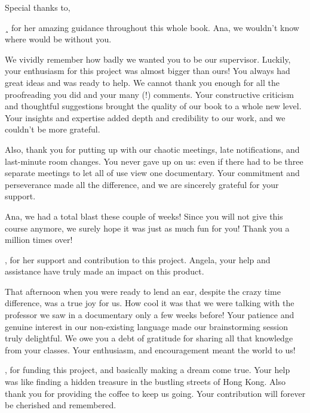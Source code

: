 
Special thanks to, 

¸ for her amazing guidance throughout this whole book. Ana, we wouldn’t know where would be without you. 

We vividly remember how badly we wanted you to be our supervisor. Luckily, your enthusiasm for this project was almost bigger than ours! You always had great ideas and was ready to help. We cannot thank you enough for all the proofreading you did and your many (!) comments. Your constructive criticism and thoughtful suggestions brought the quality of our book to a whole new level. Your insights and expertise added depth and credibility to our work, and we couldn’t be more grateful.  

Also, thank you for putting up with our chaotic meetings, late notifications, and last-minute room changes. You never gave up on us: even if there had to be three separate meetings to let all of use view one documentary. Your commitment and perseverance made all the difference, and we are sincerely grateful for your support. 

Ana, we had a total blast these couple of weeks! Since you will not give this course anymore, we surely hope it was just as much fun for you! Thank you a million times over! 

  

, for her support and contribution to this project. Angela, your help and assistance have truly made an impact on this product.  

That afternoon when you were ready to lend an ear, despite the crazy time difference, was a true joy for us. How cool it was that we were talking with the professor we saw in a documentary only a few weeks before! Your patience and genuine interest in our non-existing language made our brainstorming session truly delightful. We owe you a debt of gratitude for sharing all that knowledge from your classes. Your enthusiasm, and encouragement meant the world to us! 

 

, for funding this project,  and basically making a dream come true. Your help was like finding a hidden treasure in the bustling streets of Hong Kong. Also thank you for providing the coffee to keep us going. Your contribution will forever be cherished and remembered.
